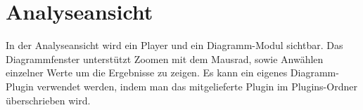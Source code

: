 \chapter{Analyseansicht}
In der Analyseansicht  wird ein Player und ein Diagramm-Modul sichtbar. Das Diagrammfenster unterstützt Zoomen mit dem Mausrad, sowie Anwählen einzelner Werte um die Ergebnisse zu zeigen.
Es kann ein eigenes Diagramm-Plugin verwendet werden, indem man das mitgelieferte Plugin im Plugins-Ordner überschrieben wird.